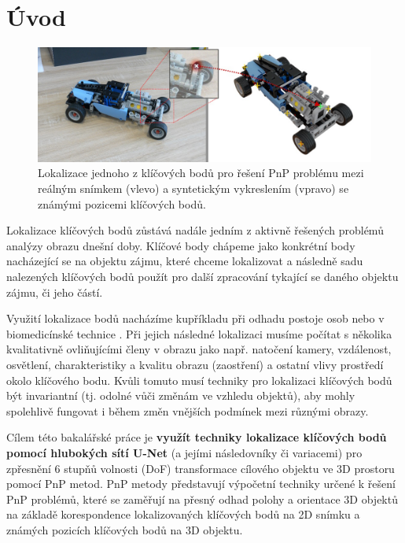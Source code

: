 \chapter{Úvod}
\label{sec:Introduction}

\begin{figure}[H]
\centering
\includegraphics[width=1.0\textwidth,keepaspectratio]{Figures/bp_uvodni_obrazek.jpg}
\caption[Lokalizace klíčového bodu pro řešení PnP problému]{Lokalizace jednoho z klíčových bodů pro řešení PnP problému mezi reálným snímkem (vlevo) a syntetickým vykreslením (vpravo) se známými pozicemi klíčových bodů.}
\label{fig:bp_uvodni_obrazek}
\end{figure}


Lokalizace klíčových bodů zůstává nadále jedním z aktivně řešených problémů analýzy obrazu dnešní doby.
Klíčové body chápeme jako konkrétní body nacházející se na objektu zájmu, které chceme lokalizovat a následně sadu nalezených klíčových bodů použít pro další zpracování tykající se daného objektu zájmu, či jeho částí.

Využití lokalizace bodů nacházíme kupříkladu při odhadu postoje osob \cite{humanpose} nebo v biomedicínské technice \cite{unet}.
Při jejich následné lokalizaci musíme počítat s několika kvalitativně ovliňujícími členy v obrazu jako např. natočení kamery, vzdálenost, osvětlení, charakteristiky a kvalitu obrazu (zaostření) a ostatní vlivy prostředí okolo klíčového bodu. Kvůli tomuto musí techniky pro lokalizaci klíčových bodů být invariantní (tj. odolné vůči změnám ve vzhledu objektů), aby mohly spolehlivě fungovat i během změn vnějších podmínek mezi různými obrazy.

Cílem této bakalářské práce je \textbf{využít techniky lokalizace klíčových bodů pomocí hlubokých sítí U-Net} (a jejími následovníky či variacemi) pro zpřesnění 6 stupňů volnosti (DoF) transformace cílového objektu ve 3D prostoru pomocí PnP metod. PnP metody představují výpočetní techniky určené k řešení PnP problémů, které se zaměřují na přesný odhad polohy a orientace 3D objektů na základě korespondence lokalizovaných klíčových bodů na 2D snímku a známých pozicích klíčových bodů na 3D objektu.

